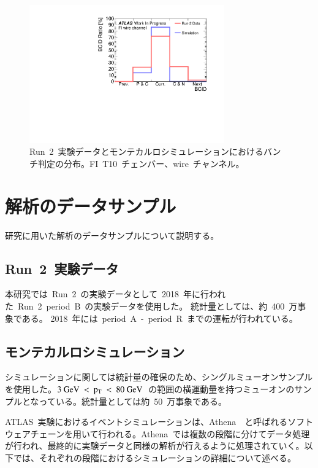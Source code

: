 \begin{figure}[H]
        \centering   
        \includegraphics[width=0.75\textwidth,page=1]{img/pdf5/BCID0.pdf}
        \caption[Run~2~実験データとモンテカルロシミュレーションにおけるバンチ判定の分布]{Run~2~実験データとモンテカルロシミュレーションにおけるバンチ判定の分布。FI~T10~チェンバー、wire~チャンネル。}
        \label{fig:bcid00}
\end{figure}

\section{解析のデータサンプル}
研究に用いた解析のデータサンプルについて説明する。

\subsection{Run~2~実験データ}
本研究では~Run~2~の実験データとして~2018~年に行われた~Run~2~period~B~の実験データを使用した。
統計量としては、約~400~万事象である。
2018~年には~period~A~-~period~R~までの運転が行われている。

\subsection{モンテカルロシミュレーション}
シミュレーションに関しては統計量の確保のため、シングルミューオンサンプルを使用した。$3~\rm{GeV}~<~p_{\rm{T}}~<~80~GeV$~の範囲の横運動量を持つミューオンのサンプルとなっている。統計量としては約~50~万事象である。

ATLAS~実験におけるイベントシミュレーションは、Athena~\cite{URL:21}~と呼ばれるソフトウェアチェーンを用いて行われる。Athena~では複数の段階に分けてデータ処理が行われ、最終的に実験データと同様の解析が行えるように処理されていく。以下では、それぞれの段階におけるシミュレーションの詳細について述べる。

